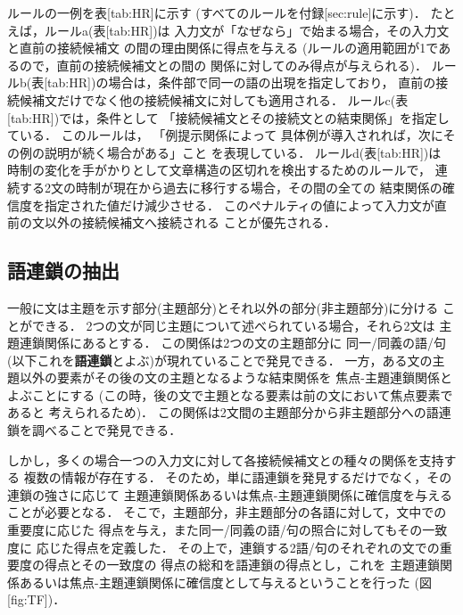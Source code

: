 ルールの一例を表[tab:HR]に示す
(すべてのルールを付録[sec:rule]に示す)．
たとえば，ルールa(表[tab:HR])は
入力文が「なぜなら」で始まる場合，その入力文と直前の接続候補文
の間の理由関係に得点を与える
(ルールの適用範囲が1であるので，直前の接続候補文との間の
関係に対してのみ得点が与えられる)．
ルールb(表[tab:HR])の場合は，条件部で同一の語の出現を指定しており，
直前の接続候補文だけでなく他の接続候補文に対しても適用される．
ルールc(表[tab:HR])では，条件として
「接続候補文とその接続文との結束関係」を指定している．
このルールは，
「例提示関係によって
具体例が導入されれば，次にその例の説明が続く場合がある」こと
を表現している．
ルールd(表[tab:HR])は
時制の変化を手がかりとして文章構造の区切れを検出するためのルールで，
連続する2文の時制が現在から過去に移行する場合，その間の全ての
結束関係の確信度を指定された値だけ減少させる．
このペナルティの値によって入力文が直前の文以外の接続候補文へ接続される
ことが優先される．

{\unitlength=1mm

}

{\unitlength=1mm

}

\subsection{語連鎖の抽出}

一般に文は主題を示す部分(主題部分)とそれ以外の部分(非主題部分)に分ける
ことができる．
2つの文が同じ主題について述べられている場合，それら2文は
主題連鎖関係にあるとする．
この関係は2つの文の主題部分に
同一/同義の語/句(以下これを{\bf 語連鎖}とよぶ)が現れていることで発見できる．
一方，ある文の主題以外の要素がその後の文の主題となるような結束関係を
焦点-主題連鎖関係とよぶことにする
(この時，後の文で主題となる要素は前の文において焦点要素であると
考えられるため)．
この関係は2文間の主題部分から非主題部分への語連鎖を調べることで発見できる．

しかし，多くの場合一つの入力文に対して各接続候補文との種々の関係を支持する
複数の情報が存在する．
そのため，単に語連鎖を発見するだけでなく，その連鎖の強さに応じて
主題連鎖関係あるいは焦点-主題連鎖関係に確信度を与えることが必要となる．
そこで，主題部分，非主題部分の各語に対して，文中での重要度に応じた
得点を与え，また同一/同義の語/句の照合に対してもその一致度に
応じた得点を定義した．
その上で，連鎖する2語/句のそれぞれの文での重要度の得点とその一致度の
得点の総和を語連鎖の得点とし，これを
主題連鎖関係あるいは焦点-主題連鎖関係に確信度として与えるということを行った
(図[fig:TF])．

